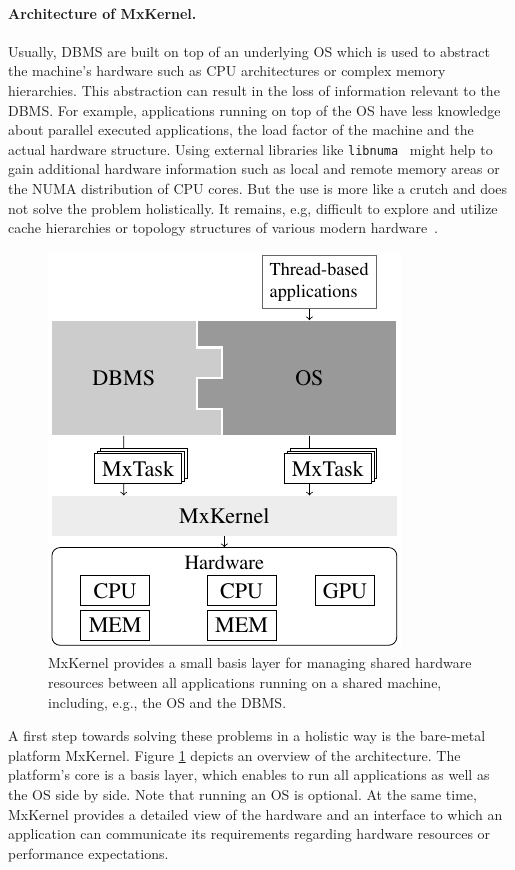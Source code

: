 \documentclass[11pt,dvipdfm]{article}
\begin{document}
\paragraph*{Architecture of MxKernel.}
Usually, DBMS are built on top of an underlying OS which is used to abstract the machine's hardware such as CPU architectures or complex memory hierarchies.
This abstraction can result in the loss of information relevant to the DBMS.
For example, applications running on top of the OS have less knowledge about parallel executed applications, the load factor of the machine and the actual hardware structure.
Using external libraries like \texttt{libnuma}~\cite{nollhrm19:kleen2005numa} might help to gain additional hardware information such as local and remote memory areas or the NUMA distribution of CPU cores.
But the use is more like a crutch and does not solve the problem holistically.
It remains, e.g, difficult to explore and utilize cache hierarchies or topology structures of various modern hardware~\cite{nollhrm19:Giceva:2013:COD}.

\begin{figure}
\centering
\includegraphics[bb=0 0 169 190]{figs/figure5.pdf}
\caption{%
MxKernel provides a small basis layer for managing shared hardware resources between all applications running on a shared machine, including, e.g., the OS and the DBMS.
}
\label{nollhrm19:plt:mxkernel}
\end{figure}

A first step towards solving these problems in a holistic way is the bare-metal platform MxKernel.
Figure \ref{nollhrm19:plt:mxkernel} depicts an overview of the architecture.
The platform's core is a basis layer, which enables to run all applications as well as the OS side by side.
Note that running an OS is optional.
At the same time, MxKernel provides a detailed view of the hardware and an interface to which an application can communicate its requirements regarding hardware resources or performance expectations.
\end{document}
